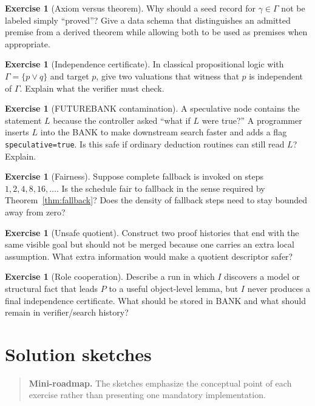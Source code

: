 \documentclass[11pt,openany]{book}
\theoremstyle{definition}
\newtheorem{exercise}[theorem]{Exercise}
\theoremstyle{remark}
\newenvironment{miniroadmap}{\begin{quote}\small\color{deepblue}\textbf{Mini-roadmap.} }{\end{quote}}
\begin{document}
\begin{exercise}[Axiom versus theorem]\label{ex:axthm}
Why should a seed record for $\gamma\in\Gamma$ not be labeled simply ``proved''? Give a data schema that distinguishes an admitted premise from a derived theorem while allowing both to be used as premises when appropriate.
\end{exercise}

\begin{exercise}[Independence certificate]\label{ex:indcert}
In classical propositional logic with $\Gamma=\{p\lor q\}$ and target $p$, give two valuations that witness that $p$ is independent of $\Gamma$. Explain what the verifier must check.
\end{exercise}

\begin{exercise}[FUTUREBANK contamination]\label{ex:contam}
A speculative node contains the statement $L$ because the controller asked ``what if $L$ were true?'' A programmer inserts $L$ into the BANK to make downstream search faster and adds a flag \texttt{speculative=true}. Is this safe if ordinary deduction routines can still read $L$? Explain.
\end{exercise}

\begin{exercise}[Fairness]\label{ex:fair}
Suppose complete fallback is invoked on steps $1,2,4,8,16,\ldots$. Is the schedule fair to fallback in the sense required by Theorem~\ref{thm:fallback}? Does the density of fallback steps need to stay bounded away from zero?
\end{exercise}

\begin{exercise}[Unsafe quotient]\label{ex:unsafeq}
Construct two proof histories that end with the same visible goal but should not be merged because one carries an extra local assumption. What extra information would make a quotient descriptor safer?
\end{exercise}

\begin{exercise}[Role cooperation]\label{ex:coop}
Describe a run in which $I$ discovers a model or structural fact that leads $P$ to a useful object-level lemma, but $I$ never produces a final independence certificate. What should be stored in BANK and what should remain in verifier/search history?
\end{exercise}

\chapter{Solution sketches}
\begin{miniroadmap}
The sketches emphasize the conceptual point of each exercise rather than presenting one mandatory implementation.
\end{miniroadmap}
\end{document}
